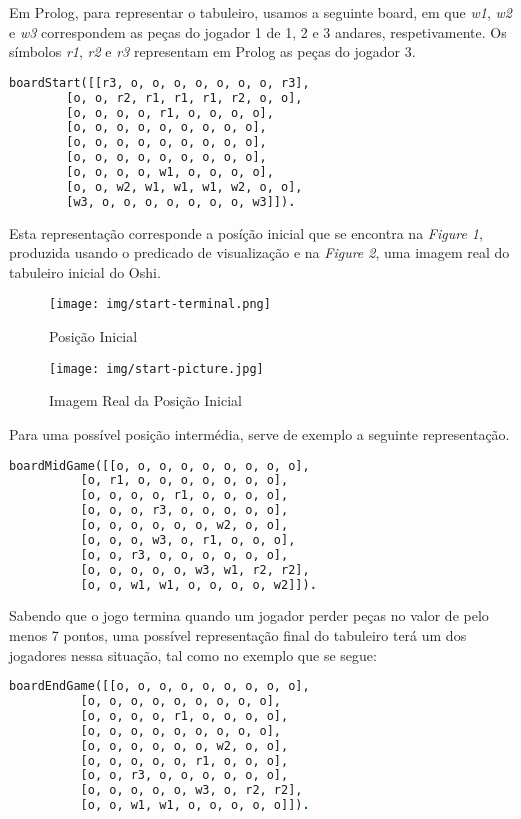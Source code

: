 \documentclass[a4paper]{article}
\begin{document}
Em Prolog, para representar o tabuleiro, usamos a seguinte board, em que \textit{w1}, \textit{w2} e \textit{w3} correspondem as peças do jogador 1 de 1, 2 e 3 andares, respetivamente. Os símbolos \textit{r1}, \textit{r2} e \textit{r3} representam em Prolog as peças do jogador 3.
\bigskip
\begin{lstlisting}[language=Prolog]
boardStart([[r3, o, o, o, o, o, o, o, r3],
	    [o, o, r2, r1, r1, r1, r2, o, o],
	    [o, o, o, o, r1, o, o, o, o],
	    [o, o, o, o, o, o, o, o, o],
	    [o, o, o, o, o, o, o, o, o],
	    [o, o, o, o, o, o, o, o, o],
	    [o, o, o, o, w1, o, o, o, o],
	    [o, o, w2, w1, w1, w1, w2, o, o],
	    [w3, o, o, o, o, o, o, o, w3]]).
\end{lstlisting}
\bigskip
Esta representação corresponde a posíção inicial que se encontra na \textit{Figure 1}, produzida usando o predicado de visualização e na \textit{Figure 2}, uma imagem real do tabuleiro inicial do Oshi.

\begin{figure}[h!]
\centering
\begin{minipage}{.4\textwidth}
  \centering
  \texttt{[image: img/start-terminal.png]}
  \caption{Posição Inicial}
  \label{fig:start}
\end{minipage}%
\begin{minipage}{.4\textwidth}
  \centering
  \texttt{[image: img/start-picture.jpg]}
  \caption{Imagem Real da Posição Inicial}
  \label{fig:real-pic}
\end{minipage}
\end{figure}
\clearpage
Para uma possível posição intermédia, serve de exemplo a seguinte representação.
\bigskip
\begin{lstlisting}[language=Prolog]
boardMidGame([[o, o, o, o, o, o, o, o, o],
	      [o, r1, o, o, o, o, o, o, o],
	      [o, o, o, o, r1, o, o, o, o],
	      [o, o, o, r3, o, o, o, o, o],
	      [o, o, o, o, o, o, w2, o, o],
	      [o, o, o, w3, o, r1, o, o, o],
	      [o, o, r3, o, o, o, o, o, o],
	      [o, o, o, o, o, w3, w1, r2, r2],
	      [o, o, w1, w1, o, o, o, o, w2]]).
\end{lstlisting}

\bigskip
Sabendo que o jogo termina quando um jogador perder peças no valor de pelo menos 7 pontos, uma possível representação final do tabuleiro terá um dos jogadores nessa situação, tal como no exemplo que se segue:

\bigskip

\begin{lstlisting}[language=Prolog]
boardEndGame([[o, o, o, o, o, o, o, o, o],
	      [o, o, o, o, o, o, o, o, o],
	      [o, o, o, o, r1, o, o, o, o],
	      [o, o, o, o, o, o, o, o, o],
	      [o, o, o, o, o, o, w2, o, o],
	      [o, o, o, o, o, r1, o, o, o],
	      [o, o, r3, o, o, o, o, o, o],
	      [o, o, o, o, o, w3, o, r2, r2],
	      [o, o, w1, w1, o, o, o, o, o]]).
\end{lstlisting}
\end{document}
